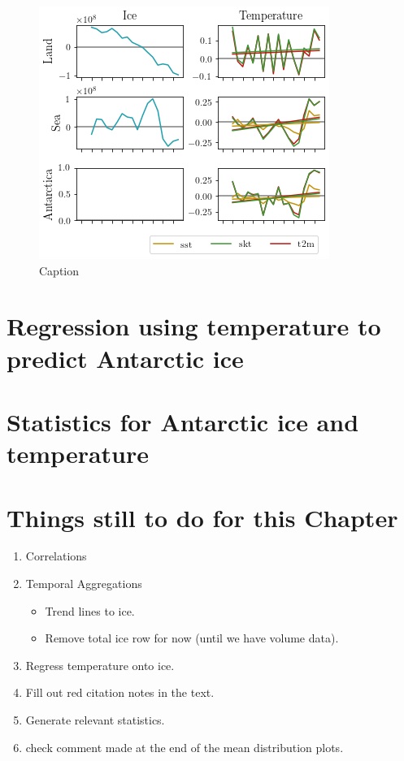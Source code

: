 \documentclass[../main.tex]{subfiles}
\begin{document}
\begin{figure}[H]
    \centering
    \includegraphics{images/week8/lres/six_timeseries}
    \caption{Caption}
    \label{fig:my_label}
\end{figure}

\section{Regression using temperature to predict Antarctic ice}

\section{Statistics for Antarctic ice and temperature}

\pagebreak
\section*{Things still to do for this Chapter}
\begin{enumerate}
    \item Correlations
    \item Temporal Aggregations
    \begin{itemize}
        \item Trend lines to ice.
        \item Remove total ice row for now (until we have volume data).
    \end{itemize}
    \item Regress temperature onto ice.
    \item Fill out red citation notes in the text.
    \item Generate relevant statistics.
    \item check comment made at the end of the mean distribution plots.
\end{enumerate}
\end{document}
